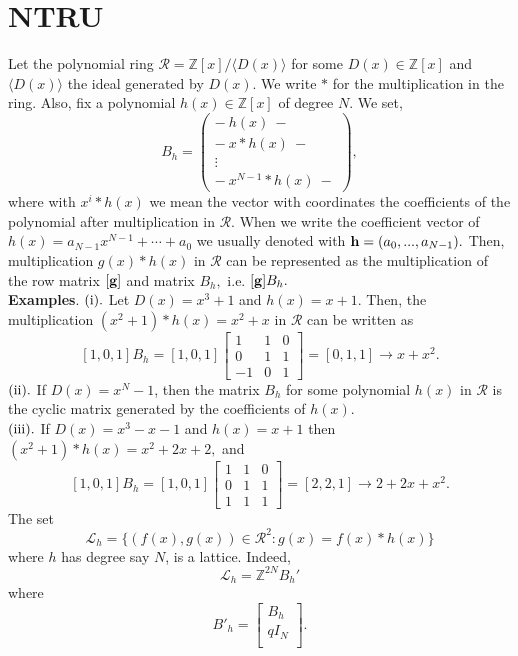 \documentclass{amsart}
\numberwithin{equation}{section}
\begin{document}
\section{NTRU}\label{sec:ntru}
Let the polynomial ring ${\mathcal{R}}={\mathbb{Z}}[x]/\langle D(x) \rangle$ for some $D(x)\in {\mathbb{Z}}[x]$ and $\langle D(x) \rangle$ the ideal generated by $D(x).$ We write $*$ for the multiplication in the ring. Also, fix a polynomial $h(x)\in {\mathbb{Z}}[x]$ of degree $N.$ We set, 
\begin{equation}\label{B_h}
B_h = \begin{pmatrix}
-\ h(x)\ - \\
-\ x*h(x)\ - \\
\vdots\\
-\ x^{N-1}*h(x)\ -
\end{pmatrix},
\end{equation}
where with $x^{i}*h(x)$ we mean the vector with coordinates the coefficients of the polynomial after multiplication in ${\mathcal{R}}.$ When we write the coefficient vector of $h(x)=a_{N-1}x^{N-1}+\cdots + a_0$ we usually denoted with ${\bf h}=(a_0,...,a_{N-1}).$
Then, multiplication $g(x)*h(x)$ in ${\mathcal{R}}$ can be represented as the multiplication of the row matrix $[{\bf g}]$ and matrix $B_h,$ i.e. $[{\bf g}]B_h.$\\
{\bf{Examples}}. $({\rm i}).$ Let $D(x)=x^3+1$ and $h(x)=x+1.$ Then, the multiplication $(x^2+1)*h(x) = x^2 + x$ in ${\mathcal{R}}$ can be written as 
$$[1,0,1]B_h=[1,0,1]\begin{bmatrix}
1&1&0\\
0&1&1\\
-1&0 &1
\end{bmatrix} = [0,1,1]\rightarrow x+x^2.$$
$({\rm ii}).$ If $D(x)=x^N-1$, then the matrix $B_h$ for some polynomial $h(x)$ in ${\mathcal{R}}$ is the cyclic matrix generated by the coefficients of $h(x).$\\
$({\rm iii}).$ If $D(x)=x^3-x-1$ and $h(x)=x+1$ then $(x^2+1)*h(x)=x^2+2x+2,$ and
$$[1,0,1]B_h=[1,0,1]\begin{bmatrix}
1&1&0\\
0&1&1\\
1&1 &1
\end{bmatrix} = [2,2,1]\rightarrow 2+2x+x^2.$$
The set 
$${\mathcal{L}}_h=\{(f(x),g(x))\in {\mathcal{R}}^2 : g(x)=f(x)*h(x)\}$$ where $h$ has degree say $N$, is a lattice. Indeed,
$${\mathcal{L}}_h={\mathbb{Z}}^{2N}B_h'$$ where 
$$B'_h=		\left[\begin{array}{c}
			 B_h  \\
			\hline
			qI_N   \\
		\end{array}\right].
			$$
\end{document}
